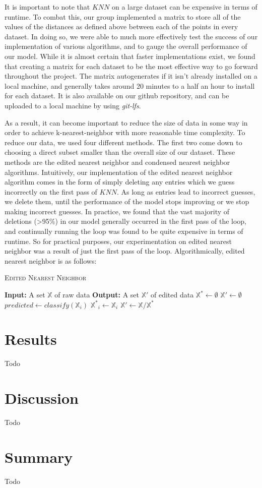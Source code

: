 \documentclass[twoside,11pt]{article}
\begin{document}
It is important to note that $KNN$ on a large dataset can be expensive in terms of runtime. To combat this, our group implemented a matrix to store all of the values of the distances
as defined above between each of the points in every dataset. In doing so, we were able to much more effectively test the success of our implementation of various algorithms, and to
gauge the overall performance of our model. While it is almost certain that faster implementations exist, we found that creating a matrix for each dataset to be the most effective
way to go forward throughout the project. The matrix autogenerates if it isn't already installed on a local machine, and generally takes around 20 minutes to a half an hour to install
for each dataset. It is also available on our github repository, and can be uploaded to a local machine by using \textit{git-lfs}. 

As a result, it can become important to reduce the size of data in some way in order to achieve k-nearest-neighbor with more reasonable time complexity. To reduce our data, we used
four different methods. The first two come down to choosing a direct subset smaller than the overall size of our dataset. These methods are the edited nearest neighbor and condensed
nearest neighbor algorithms. Intuitively, our implementation of the edited nearest neighbor algorithm comes in the form of simply deleting any entries which we guess incorrectly on the
first pass of $KNN$. As long as entries lead to incorrect guesses, we delete them, until the performance of the model stops improving or we stop making incorrect guesses.
In practice, we found that the vast majority of deletions (>95\%) in our model generally occurred in the first pass of the loop, and continually running the loop was found to be quite expensive in terms of runtime.
So for practical purposes, our experimentation on edited nearest neighbor was a result of just the first pass of the loop.
Algorithmically, edited nearest neighbor is as follows:
\begin{algorithm}
\begin{algorithmic}
\caption{\textsc{Edited Nearest Neighbor}}
\STATE \textbf{Input:} A set $\mathbb{X}$ of raw data
\STATE \textbf{Output:} A set $\mathbb{X}'$ of edited data
\STATE $\mathbb{X}^* \gets \emptyset$
\STATE $\mathbb{X}' \gets \emptyset$
\STATE $predicted \gets classify(\mathbb{X}_i)$
\STATE $\mathbb{X^*}_i \gets \mathbb{X}_i$
\ENDIF
\ENDFOR
\STATE $\mathbb{X'} \gets \mathbb{X}/\mathbb{X^*}$
\ENDWHILE
\end{algorithmic}
\end{algorithm}



\section{Results}
Todo

\section{Discussion}
Todo


\section{Summary}
Todo
\end{document}
